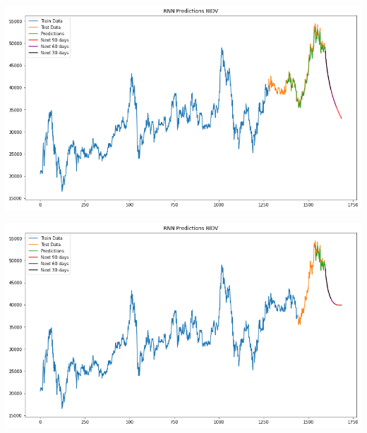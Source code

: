 \documentclass[conference]{IEEEtran}
\begin{document}
\begin{minipage}{0.23\textwidth}
    \centering
    \includegraphics[width=\linewidth]{images/RNN/RNN_BIDV_82.png}
    \label{fig:image1}
\end{minipage}
\hfill
\begin{minipage}{0.23\textwidth}
    \centering
    \includegraphics[width=\linewidth]{images/RNN/RNN_BIDV_91.png}
    \label{fig:image2}
\end{minipage}
\end{document}
